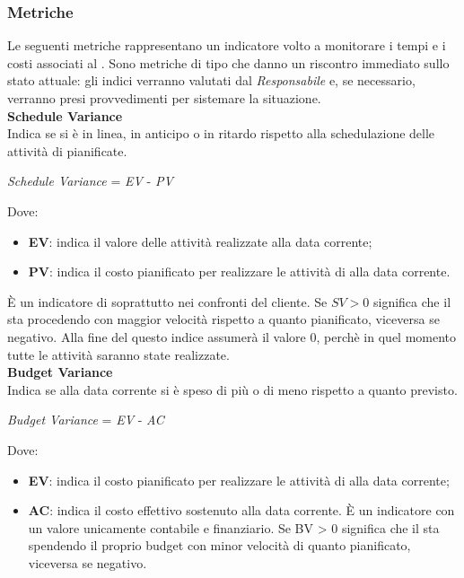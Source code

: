 \subsubsection{Metriche}\label{MetricheProc}
\hypertarget{metriche_processi}{}
Le seguenti metriche rappresentano un indicatore volto a monitorare i tempi e i costi associati al . Sono metriche di tipo  che danno un riscontro immediato sullo stato attuale: gli indici verranno valutati dal \textit{Responsabile} e, se necessario, verranno presi provvedimenti per sistemare la situazione.\\

\textbf{Schedule Variance}\\

Indica se si è in linea, in anticipo o in ritardo rispetto alla schedulazione delle attività di 
pianificate.
\begin{center}
	\textit{Schedule Variance} = \textit{EV} - \textit{PV} 
\end{center}
Dove:
\begin{itemize}
	\item \textbf{EV}: indica il valore delle attivit\`a realizzate alla data corrente;
	\item \textbf{PV}: indica il costo pianificato per realizzare le attività di  alla data corrente.
\end{itemize}
\`E un indicatore di  soprattutto nei confronti del cliente. Se \begin{math}{SV > 0}\end{math} significa che il  sta procedendo con maggior velocit\`a rispetto a quanto pianificato, viceversa se negativo. Alla fine del  questo indice assumer\`a il valore 0, perch\`e in quel momento tutte le attivit\`a saranno state realizzate.\\

\textbf{Budget Variance}\\

Indica se alla data corrente si \`e speso di pi\`u o di meno rispetto a quanto previsto.\\
\begin{center}
	\textit{Budget Variance} = \textit{EV} - \textit{AC}
\end{center}
Dove:
\begin{itemize}
	\item \textbf{EV}: indica il costo pianificato per realizzare le attività di  alla data corrente;
	\item \textbf{AC}: indica il costo effettivo sostenuto alla data corrente. \`E un indicatore con
un valore unicamente contabile e finanziario. Se BV > 0 significa che il  sta spendendo
il proprio budget con minor velocità di quanto pianificato, viceversa se negativo.
\end{itemize}


